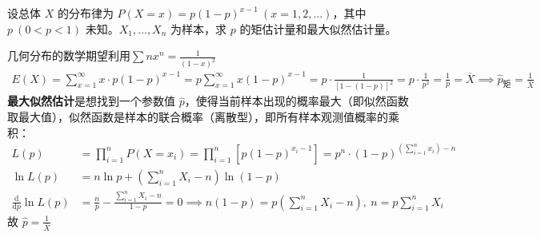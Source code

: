 \documentclass[lang=cn,11pt]{elegantbook}
\begin{document}
\begin{exercise}\label{exer:7-geometric}
设总体 \(X\) 的分布律为 \(P(X=x) = p(1-p)^{x-1}\ (x=1,2,\dots)\)，其中 \(p\ (0<p<1)\) 未知。\(X_1, \dots, X_n\) 为样本，求 \(p\) 的矩估计量和最大似然估计量。
\end{exercise}
\begin{solution}
几何分布的数学期望利用$\displaystyle \sum nx^n=\frac{1}{(1-x)^2}$
\begin{align*}
E(X) = \sum_{x=1}^\infty x \cdot p(1-p)^{x-1} = p \sum_{x=1}^\infty x(1-p)^{x-1} = p \cdot \frac{1}{[1-(1-p)]^2} = p \cdot \frac{1}{p^2} = \frac{1}{p}= \overline{X}\implies \hat{p}_{\text{矩}} = \frac1{\overline{X}}
\end{align*}
\textbf{最大似然估计}是想找到一个参数值 $\hat{p}$，使得当前样本出现的概率最大（即似然函数取最大值），似然函数是样本的联合概率（离散型），即所有样本观测值概率的乘积：
\begin{align*}
L(p) &= \prod_{i=1}^n P(X=x_i) = \prod_{i=1}^n \left[ p(1-p)^{x_i-1} \right]=  p^n \cdot (1-p)^{\left( \sum_{i=1}^n x_i \right) - n}\\
\ln L(p) &= n\ln p + \left( \sum_{i=1}^n X_i - n \right) \ln(1-p)\\
\frac{\mathrm{d}}{\mathrm{d}p} \ln L(p) &= \frac{n}{p} - \frac{\sum_{i=1}^n X_i - n}{1-p} = 0\implies n(1-p) = p\left( \sum_{i=1}^n X_i - n \right),~n = p\sum_{i=1}^n X_i
\end{align*}
故 \(\hat{p} = \frac{1}{\overline{X}}\)
\end{solution}
\end{document}
